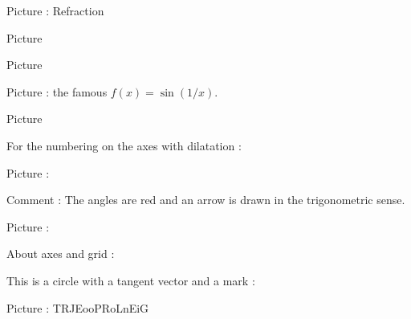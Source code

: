 Picture : Refraction
\begin{center}
   
\end{center}



Picture 
\newcommand{\CaptionFigOMPAooMbyOIqeA}{Marks are correct.}


\clearpage


Picture 
\begin{center}
   
\end{center}
   

\clearpage


Picture  : the famous \( f(x)=\sin(1/x)\).
\begin{center}
   
\end{center}
   

Picture 
\begin{center}
   
\end{center}
   

For the numbering on the axes with dilatation : 
\begin{center}
   
\end{center}



Picture : 
\begin{center}
   
\end{center}
Comment : The angles are red and an arrow is drawn in the trigonometric sense.


Picture : 
\begin{center}
   
\end{center}

About axes and grid : 
\begin{center}
   
\end{center}
   


This is a circle with a tangent vector and a mark :

Picture : TRJEooPRoLnEiG
\begin{center}
    
\end{center}



